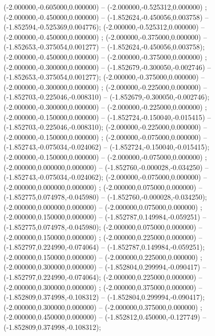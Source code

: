  (-2.000000,-0.605000,0.000000) -- (-2.000000,-0.525312,0.000000) ;
 (-2.000000,-0.450000,0.000000) -- (-1.852624,-0.450056,0.003758) -- (-1.852594,-0.525369,0.004776);
 (-2.000000,-0.525312,0.000000) -- (-2.000000,-0.450000,0.000000) ;
 (-2.000000,-0.375000,0.000000) -- (-1.852653,-0.375054,0.001277) -- (-1.852624,-0.450056,0.003758);
 (-2.000000,-0.450000,0.000000) -- (-2.000000,-0.375000,0.000000) ;
 (-2.000000,-0.300000,0.000000) -- (-1.852679,-0.300050,-0.002746) -- (-1.852653,-0.375054,0.001277);
 (-2.000000,-0.375000,0.000000) -- (-2.000000,-0.300000,0.000000) ;
 (-2.000000,-0.225000,0.000000) -- (-1.852703,-0.225046,-0.008310) -- (-1.852679,-0.300050,-0.002746);
 (-2.000000,-0.300000,0.000000) -- (-2.000000,-0.225000,0.000000) ;
 (-2.000000,-0.150000,0.000000) -- (-1.852724,-0.150040,-0.015415) -- (-1.852703,-0.225046,-0.008310);
 (-2.000000,-0.225000,0.000000) -- (-2.000000,-0.150000,0.000000) ;
 (-2.000000,-0.075000,0.000000) -- (-1.852743,-0.075034,-0.024062) -- (-1.852724,-0.150040,-0.015415);
 (-2.000000,-0.150000,0.000000) -- (-2.000000,-0.075000,0.000000) ;
 (-2.000000,0.000000,0.000000) -- (-1.852760,-0.000028,-0.034250) -- (-1.852743,-0.075034,-0.024062);
 (-2.000000,-0.075000,0.000000) -- (-2.000000,0.000000,0.000000) ;
 (-2.000000,0.075000,0.000000) -- (-1.852775,0.074978,-0.045980) -- (-1.852760,-0.000028,-0.034250);
 (-2.000000,0.000000,0.000000) -- (-2.000000,0.075000,0.000000) ;
 (-2.000000,0.150000,0.000000) -- (-1.852787,0.149984,-0.059251) -- (-1.852775,0.074978,-0.045980);
 (-2.000000,0.075000,0.000000) -- (-2.000000,0.150000,0.000000) ;
 (-2.000000,0.225000,0.000000) -- (-1.852797,0.224990,-0.074064) -- (-1.852787,0.149984,-0.059251);
 (-2.000000,0.150000,0.000000) -- (-2.000000,0.225000,0.000000) ;
 (-2.000000,0.300000,0.000000) -- (-1.852804,0.299994,-0.090417) -- (-1.852797,0.224990,-0.074064);
 (-2.000000,0.225000,0.000000) -- (-2.000000,0.300000,0.000000) ;
 (-2.000000,0.375000,0.000000) -- (-1.852809,0.374998,-0.108312) -- (-1.852804,0.299994,-0.090417);
 (-2.000000,0.300000,0.000000) -- (-2.000000,0.375000,0.000000) ;
 (-2.000000,0.450000,0.000000) -- (-1.852812,0.450000,-0.127749) -- (-1.852809,0.374998,-0.108312);
